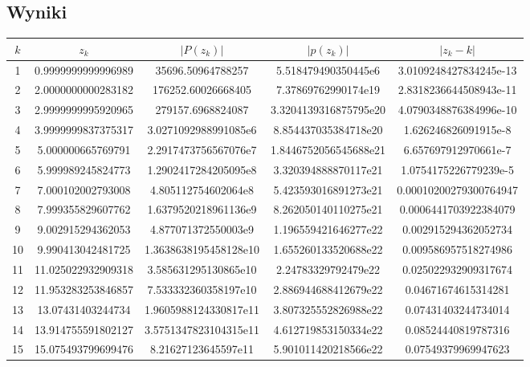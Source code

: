 \documentclass{article}
\begin{document}
\subsection{Wyniki}
\begin{table}[H]
\begin{adjustbox}{center}
\begin{tabular}{|c|c|c|c|c|}
    \hline
    $k$ & $z_k$ & $|P(z_k)|$ & $|p(z_k)|$ & $ |z_k - k|$\\
    \hline
    1 & 0.9999999999996989 & 35696.50964788257 & 5.518479490350445e6 & 3.0109248427834245e-13\\
    \hline
    2 & 2.0000000000283182 & 176252.60026668405 & 7.37869762990174e19 & 2.8318236644508943e-11\\
    \hline
    3 & 2.9999999995920965 & 279157.6968824087 & 3.3204139316875795e20 & 4.0790348876384996e-10\\
    \hline
    4 & 3.9999999837375317 & 3.0271092988991085e6 & 8.854437035384718e20 & 1.626246826091915e-8\\
    \hline
    5 & 5.000000665769791 & 2.2917473756567076e7 & 1.8446752056545688e21 & 6.657697912970661e-7\\
    \hline
    6 & 5.999989245824773 & 1.2902417284205095e8 & 3.320394888870117e21 & 1.0754175226779239e-5\\
    \hline
    7 & 7.000102002793008 & 4.805112754602064e8 & 5.423593016891273e21 & 0.00010200279300764947\\
    \hline
    8 & 7.999355829607762 & 1.6379520218961136e9 & 8.262050140110275e21 & 0.0006441703922384079\\
    \hline
    9 & 9.002915294362053 & 4.877071372550003e9 & 1.196559421646277e22 & 0.002915294362052734\\
    \hline
    10 & 9.990413042481725 & 1.3638638195458128e10 & 1.655260133520688e22 & 0.009586957518274986\\
    \hline
    11 & 11.025022932909318 & 3.585631295130865e10 & 2.24783329792479e22 & 0.025022932909317674\\
    \hline
    12 & 11.953283253846857 & 7.533332360358197e10 & 2.886944688412679e22 & 0.04671674615314281\\
    \hline
    13 & 13.07431403244734 & 1.9605988124330817e11 & 3.807325552826988e22 & 0.07431403244734014\\
    \hline
    14 & 13.914755591802127 & 3.5751347823104315e11 & 4.612719853150334e22 & 0.08524440819787316\\
    \hline
    15 & 15.075493799699476 & 8.21627123645597e11 & 5.901011420218566e22 & 0.07549379969947623\\

\end{tabular}
\end{adjustbox}
\end{table}
\end{document}
